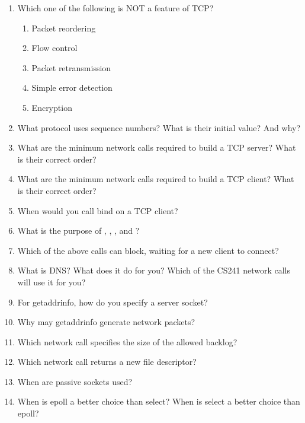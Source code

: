 \begin{enumerate}
\item Which one of the following is NOT a feature of TCP?
  \begin{enumerate}
  \item Packet reordering
  \item Flow control
  \item Packet retransmission
  \item Simple error detection
  \item Encryption
  \end{enumerate}

\item What protocol uses sequence numbers? What is their initial value? And why?

\item What are the minimum network calls required to build a TCP server? What is their correct order?

\item What are the minimum network calls required to build a TCP client? What is their correct order?

\item When would you call bind on a TCP client?

\item What is the purpose of , , , and ?

\item Which of the above calls can block, waiting for a new client to connect?

\item What is DNS? What does it do for you? Which of the CS241 network calls will use it for you?

\item For getaddrinfo, how do you specify a server socket?

\item Why may getaddrinfo generate network packets?

\item Which network call specifies the size of the allowed backlog?

\item Which network call returns a new file descriptor?

\item When are passive sockets used?

\item When is epoll a better choice than select? When is select a better choice than epoll?


\end{enumerate}
